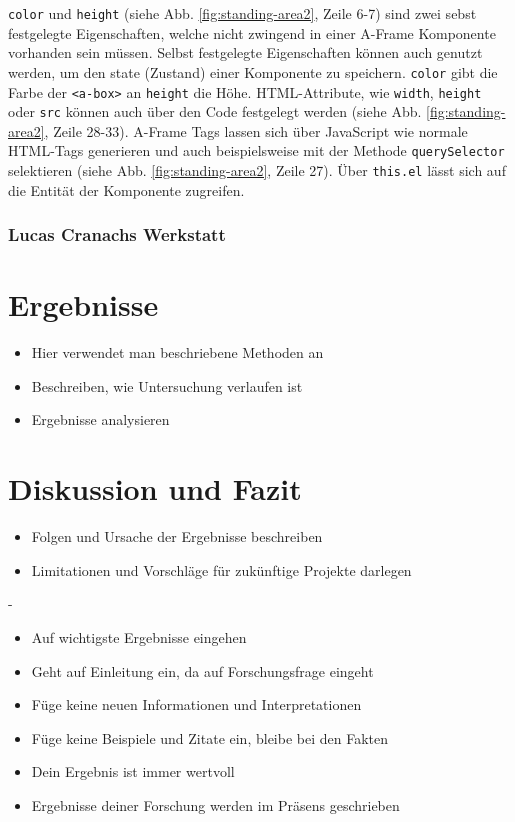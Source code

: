 \documentclass[a4paper,12pt,oneside]{article}
\begin{document}
        \texttt{color} und \texttt{height} 
        (siehe Abb. \ref{fig:standing-area2}, Zeile 6-7)
        sind zwei sebst festgelegte
        Eigenschaften, welche nicht zwingend in einer A-Frame Komponente
        vorhanden sein müssen. Selbst festgelegte Eigenschaften können
        auch genutzt werden, um den state (Zustand) einer Komponente
        zu speichern. \texttt{color} gibt die Farbe der \texttt{<a-box>}
        an \texttt{height} die Höhe. HTML-Attribute, wie \texttt{width},
        \texttt{height} oder \texttt{src} können auch über den Code
        festgelegt werden 
        (siehe Abb. \ref{fig:standing-area2}, Zeile 28-33). 
        A-Frame Tags lassen sich über JavaScript wie normale HTML-Tags
        generieren und auch beispielsweise mit der Methode \texttt{querySelector}
        selektieren
        (siehe Abb. \ref{fig:standing-area2}, Zeile 27). Über \texttt{this.el}
        lässt sich auf die Entität der Komponente zugreifen.

        
      \subsubsection{Lucas Cranachs Werkstatt}
  \section{Ergebnisse}
    \begin{itemize}
      \item Hier verwendet man beschriebene Methoden an
      \item Beschreiben, wie Untersuchung verlaufen ist
      \item Ergebnisse analysieren
    \end{itemize}
  \section{Diskussion und Fazit}
    \begin{itemize}
      \item Folgen und Ursache der Ergebnisse beschreiben
      \item Limitationen und Vorschläge für zukünftige Projekte darlegen
    \end{itemize}
    -
    \begin{itemize}
      \item Auf wichtigste Ergebnisse eingehen
      \item Geht auf Einleitung ein, da auf Forschungsfrage eingeht
      \item Füge keine neuen Informationen und Interpretationen
      \item Füge keine Beispiele und Zitate ein, bleibe bei den Fakten
      \item Dein Ergebnis ist immer wertvoll
      \item Ergebnisse deiner Forschung werden im Präsens geschrieben
    \end{itemize}
\end{document}
